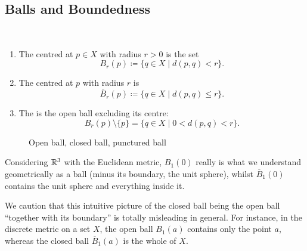 \subsection{Balls and Boundedness}
\begin{definition}[Balls] \
\begin{enumerate}[label=(\roman*)]
\item The  centred at $p\in X$ with radius $r>0$ is the set
\[B_r(p)\coloneqq\{q\in X\mid d(p,q)<r\}.\]
\item The  centred at $p$ with radius $r$ is
\[\overline{B}_r(p)\coloneqq\{q\in X\mid d(p,q)\le r\}.\]
\item The  is the open ball excluding its centre:
\[B_r(p)\setminus\{p\}=\{q\in X\mid 0<d(p,q)<r\}.\]
\end{enumerate}
\end{definition}

\begin{figure}[H]
\centering
{}
\caption{Open ball, closed ball, punctured ball}
\end{figure}

\begin{example}
Considering $\mathbb R^3$ with the Euclidean metric, $B_1(0)$ really is what we understand geometrically as a ball (minus its boundary, the unit sphere), whilst $\overline{B}_1(0)$ contains the unit sphere and everything inside it.
\end{example}

\begin{remark}
We caution that this intuitive picture of the closed ball being the open ball ``together with its boundary'' is totally misleading in general. For instance, in the discrete metric on a set $X$, the open ball $B_1(a)$ contains only the point $a$, whereas the closed ball $\overline{B}_1(a)$ is the whole of $X$.
\end{remark}

